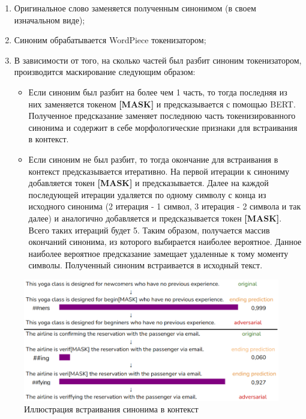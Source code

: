 \begin{enumerate}
    \item Оригинальное слово заменяется полученным синонимом (в своем изначальном виде);
    \item Синоним обрабатывается WordPiece токенизатором;
    \item В зависимости от того, на сколько частей был разбит синоним токенизатором, производится маскирование следующим образом:
        \begin{itemize}
            \item Если синоним был разбит на более чем 1 часть, то тогда последняя из них заменяется токеном \textbf{[MASK]} и предсказывается с помощью BERT. Полученное предсказание заменяет последнюю часть токенизированного синонима и содержит в себе морфологические признаки для встраивания в контекст.
            \item Если синоним не был разбит, то тогда окончание для встраивания в контекст предсказывается итеративно. На первой итерации к синониму добавляется токен \textbf{[MASK]} и предсказывается. Далее на каждой последующей итерации удаляется по одному символу с конца из исходного синонима (2 итерация - 1 символ, 3 итерация - 2 символа и так далее) и аналогично добавляется и предсказывается токен \textbf{[MASK]}. Всего таких итераций будет 5. Таким образом, получается массив окончаний синонима, из которого выбирается наиболее вероятное. Данное наиболее вероятное предсказание замещает удаленные к тому моменту символы. Полученный синоним встраивается в исходный текст.
        \end{itemize}
\end{enumerate}

\begin{figure}[h]
    \centering
    \includegraphics[width=\textwidth]{pictures/AdversialWord.png}
    \caption{Иллюстрация встраивания синонима в контекст}
    \label{fig:enter-label}
\end{figure}